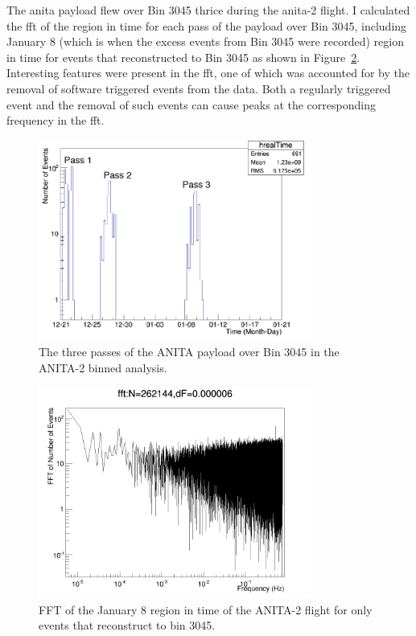 The \gls{anita} payload flew over Bin 3045 thrice during the \gls{anita}-2 flight. I calculated the \gls{fft} of the region in time for each pass of the payload over Bin 3045, including January 8 (which is when the excess events from Bin 3045 were recorded) region in time for events that reconstructed to Bin 3045 as shown in Figure~\ref{fft_jan8}. Interesting features were present in the \gls{fft}, one of which was accounted for by the removal of software triggered events from the data. Both a regularly triggered event and the removal of such events can cause peaks at the corresponding frequency in the \gls{fft}.

\begin{figure}
\centering
\includegraphics[width=0.8\textwidth]{figures/bin3045_3passes.png}
\caption{The three passes of the ANITA payload over Bin 3045 in the ANITA-2 binned analysis. }
\label{bin3045_3passes}
\end{figure}


\begin{figure}
\centering
\includegraphics[width=0.8\textwidth]{figures/bin3045realTimeFFTJan8.png}
\caption{FFT of the January 8 region in time of the ANITA-2 flight for only events that reconstruct to bin 3045.}
\label{fft_jan8}
\end{figure}

